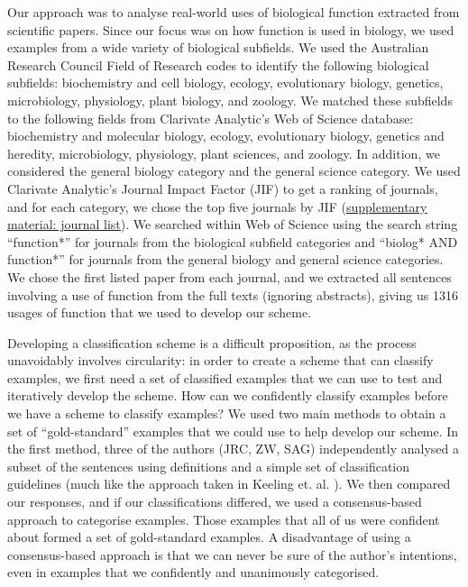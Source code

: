 \documentclass{article}
\begin{document}
Our approach was to analyse real-world uses of biological function extracted from scientific papers.
Since our focus was on how function is used in biology, we used examples from a wide variety of biological subfields.
We used the Australian Research Council Field of Research codes to identify the following biological subfields: biochemistry and cell biology, ecology, evolutionary biology, genetics, microbiology, physiology, plant biology, and zoology.
We matched these subfields to the following fields from Clarivate Analytic’s Web of Science database: biochemistry and molecular biology, ecology, evolutionary biology, genetics and heredity, microbiology, physiology, plant sciences, and zoology.
In addition, we considered the general biology category and the general science category.
We used Clarivate Analytic’s Journal Impact Factor (JIF) to get a ranking of journals, and for each category, we chose the top five journals by JIF (\href{https://github.com/joshuachristie/function-concepts/blob/master/supplementary_material/list_of_journals.txt}{\underline{supplementary material: journal list}}).
We searched within Web of Science using the search string ``function*'' for journals from the biological subfield categories and ``biolog* AND function*'' for journals from the general biology and general science categories.
We chose the first listed paper from each journal, and we extracted all sentences involving a use of function from the full texts (ignoring abstracts), giving us 1316 usages of function that we used to develop our scheme.

Developing a classification scheme is a difficult proposition, as the process unavoidably involves circularity: in order to create a scheme that can classify examples, we first need a set of classified examples that we can use to test and iteratively develop the scheme.
How can we confidently classify examples before we have a scheme to classify examples?
We used two main methods to obtain a set of ``gold-standard'' examples that we could use to help develop our scheme.
In the first method, three of the authors (JRC, ZW, SAG) independently analysed a subset of the sentences using definitions and a simple set of classification guidelines (much like the approach taken in Keeling et. al. \cite{keeling2019}).
We then compared our responses, and if our classifications differed, we used a consensus-based approach to categorise examples.
Those examples that all of us were confident about formed a set of gold-standard examples.
A disadvantage of using a consensus-based approach is that we can never be sure of the author's intentions, even in examples that we confidently and unanimously categorised.
\end{document}
